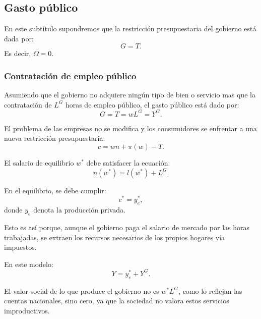 \documentclass[8pt,a4paper]{extarticle}
\begin{document}
\begin{multicols}{3}
	\newpage

	\subsection{Gasto público}

	\begin{boxrmk}
		En este subtítulo supondremos que la restricción presupuestaria del gobierno está dada por:
		\[G = T.\]
		Es decir, $\Omega = 0$.
	\end{boxrmk}

	\subsubsection{Contratación de empleo público}

	\begin{boxprop}
		Asumiendo que el gobierno no adquiere ningún tipo de bien o servicio mas que la contratación de $L^G$ horas de empleo público, el gasto público está dado por:
		\[G = T = wL^G = Y^G.\]
	\end{boxprop}

	\begin{boxrmk}
		El problema de las empresas no se modifica y los consumidores se enfrentar a una nueva restricción presupuestaria:
		\[c = wn + \pi(w) - T.\]
	\end{boxrmk}

	\begin{boxprop}
		El salario de equilibrio $w^*$ debe satisfacer la ecuación:
		\[n(w^*) = l(w^*) + L^G.\]
	\end{boxprop}

	\begin{boxrmk}
		En el equilibrio, se debe cumplir:
		\[c^* = y^*_e,\]
		donde $y_e$ denota la producción privada. \par
		Esto es así porque, aunque el gobierno paga el salario de mercado por las horas trabajadas, se extraen los recursos necesarios de los propios hogares vía impuestos.
	\end{boxrmk}

	\begin{boxrmk}
		En este modelo:
		\[Y = y^*_e + Y^G.\]
	\end{boxrmk}

	\begin{boxrmk}
		El valor social de lo que produce el gobierno no es $w^* L^G$, como lo reflejan las cuentas nacionales, sino cero, ya que la sociedad no valora estos servicios improductivos.
	\end{boxrmk}


\end{multicols}
\end{document}
